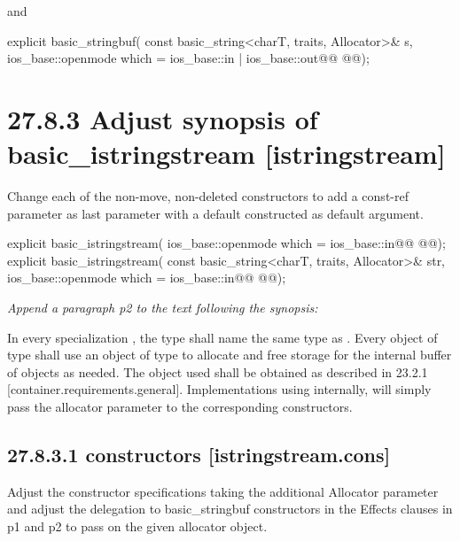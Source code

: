\documentclass[ebook,11pt,article]{memoir}
\begin{document}
and

\begin{itemdecl}
explicit basic_stringbuf(
  const basic_string<charT, traits, Allocator>& s,
  ios_base::openmode which = ios_base::in | ios_base::out@\ins{,}@
  @@);
\end{itemdecl}

\section{27.8.3 Adjust synopsis of basic\_istringstream [istringstream]}
Change each of the non-move, non-deleted constructors to add a const-ref  parameter as last parameter with a default constructed  as default argument. 
\begin{codeblock}
explicit basic_istringstream(
             ios_base::openmode which = ios_base::in@\ins{,}@
             @@);
explicit basic_istringstream(
             const basic_string<charT, traits, Allocator>& str,
             ios_base::openmode which = ios_base::in@\ins{,}@
             @@);
\end{codeblock}

\textit{Append a paragraph p2 to the text following the synopsis:}

\begin{insrt}
\pnum
In every specialization , the type  shall name the same type as . Every object of type  shall use an object of type  to allocate and free storage for the internal buffer of  objects as needed. The  object used shall be obtained as described in 23.2.1 [container.requirements.general].
\enternote
Implementations using  internally, will simply pass the allocator parameter to the corresponding  constructors.
\exitnote
\end{insrt}

\subsection{27.8.3.1  constructors [istringstream.cons]}
Adjust the constructor specifications taking the additional Allocator parameter and adjust the delegation to basic_stringbuf constructors in the Effects clauses in p1 and p2 to pass on the given allocator object.
\end{document}
